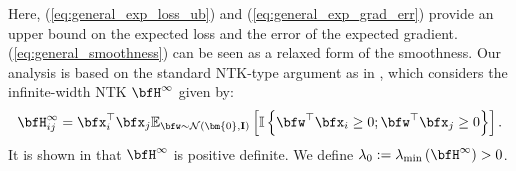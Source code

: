 \documentclass[10pt]{article} %
\theoremstyle{definition}
\theoremstyle{plain}
\newcommand{\paren}[1]{\left(#1\right)}
\newcommand{\indy}[1]{\mathbb{I}\left\{#1\right\}}
\providecommand{\E}{\mathbb{E}}
\def\bfI{{\mathbf{I}}}\def\bfJ{{\mathbf{J}}}\def\bfK{{\mathbf{K}}}\def\bfL{{\mathbf{L}}}
\begin{document}
Here, (\ref{eq:general_exp_loss_ub}) and (\ref{eq:general_exp_grad_err}) provide an upper bound on the expected loss and the error of the expected gradient. 
(\ref{eq:general_smoothness}) can be seen as a relaxed form of the smoothness. 
Our analysis is based on the standard NTK-type argument as in \citep{du2018gradient,song2020quadraticsufficesoverparametrizationmatrix,liao2022convergence}, which considers the infinite-width NTK $\bfH^\infty$ given by:
\begin{equation}
    \label{eq:infinite_NTK_def}
    \bfH^\infty_{ij} = \bfx_i^\top\bfx_j \E_{\bfw\sim\mathcal{N}\paren{\bm{0},\bfI}}\left[\indy{\bfw^\top\bfx_i\geq 0;\bfw^\top\bfx_j\geq 0}\right].
\end{equation}
It is shown in \cite{du2018gradient} that $\bfH^\infty$ is positive definite. We define $\lambda_0:=\lambda_{\min}\paren{\bfH^\infty} > 0$.
\end{document}
